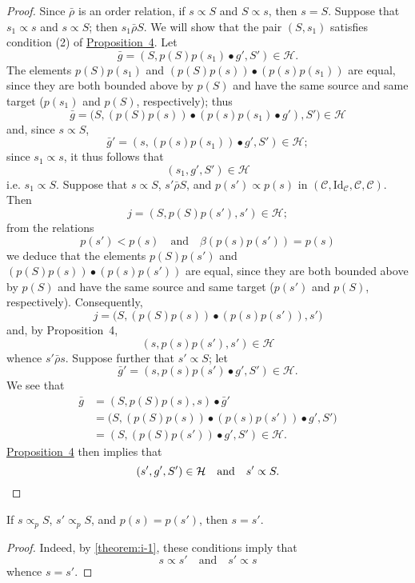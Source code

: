 \documentclass[a4paper,fleqn]{article}
\theoremstyle{plain}
\newenvironment{corollary}[1]
  {\renewcommand\theinnercorollary{#1}\innercorollary}
  {\endinnercorollary}
\theoremstyle{definition}
\newcommand{\oldpage}[1]{{\marginpar{\footnotesize$\bigg\vert$\,\,\,\,\textit{p.~#1}}}}
\newcommand{\textand}{\quad\text{and}\quad}
\newcommand{\CC}{\mathcal{C}}
\newcommand{\HH}{\mathcal{H}}
\newcommand{\relrhobar}{\mathrel{\bar{\rho}}}
\newcommand{\subs}{\mathrel{\propto}}
\newcommand{\Id}{\mathrm{Id}}
\begin{document}
\begin{proof}
  Since $\relrhobar$ is an order relation, if $s\subs S$ and $S\subs s$, then $s=S$.
  Suppose that $s_1\subs s$ and $s\subs S$;
  then $s_1\relrhobar S$.
  We will show that the pair $(S,s_1)$ satisfies condition (2\textquotesingle) of \hyperref[proposition:i-4]{Proposition~4}.
  Let
  \[
    \bar{g}
    = (S,p(S)p(s_1)\bullet g',S')
    \in\HH.
  \]
  The elements $p(S)p(s_1)$ and $(p(S)p(s))\bullet(p(s)p(s_1))$ are equal, since they are both bounded above by $p(S)$ and have the same source and same target ($p(s_1)$ and $p(S)$, respectively);
  thus
  \[
    \bar{g}
    = \big(S,(p(S)p(s))\bullet(p(s)p(s_1)\bullet g'),S'\big)
    \in\HH
  \]
  and, since $s\subs S$,
  \[
    \bar{g}'
    = (s,(p(s)p(s_1))\bullet g', S')
    \in\HH;
  \]
  since $s_1\subs s$, it thus follows that
  \[
    (s_1,g',S')
    \in\HH
  \]
  i.e. $s_1\subs S$.
  Suppose that $s\subs S$, $s'\relrhobar S$, and $p(s')\subs p(s)$ in $(\CC,\Id_\CC,\CC,\CC)$.
  Then
  \[
    j
    = (S,p(S)p(s'),s')
    \in\HH;
  \]
  from the relations
  \[
    p(s') < p(s)
    \textand
    \beta(p(s)p(s')) = p(s)
  \]
  we deduce that the elements $p(S)p(s')$ and $(p(S)p(s))\bullet(p(s)p(s'))$ are equal, since they are both bounded above by $p(S)$ and have the same source and same target ($p(s')$ and $p(S)$, respectively).
  Consequently,
  \[
    j
    = \big(S,(p(S)p(s))\bullet(p(s)p(s')),s'\big)
  \]
  and, by Proposition~4,
  \[
    (s,p(s)p(s'),s')
    \in\HH
  \]
  whence $s'\relrhobar s$.
  Suppose further that $s'\subs S$;
  let
  \[
    \bar{g}'
    = (s,p(s)p(s')\bullet g',S')
    \in\HH.
  \]
  We see that
  \[
    \begin{aligned}
      \bar{g}
      &= (S,p(S)p(s),s)\bullet\bar{g}'
    \\&= \big(S,(p(S)p(s))\bullet(p(s)p(s'))\bullet g',S'\big)
    \\&= (S,(p(S)p(s'))\bullet g',S')
    \in\HH.
    \end{aligned}
  \]
  \oldpage{363}
  \hyperref[proposition:i-4]{Proposition~4} then implies that
  \[
    (s',g',S')\in\HH
    \textand
    s'\subs S.
    \qedhere
  \]
\end{proof}

\begin{corollary}{1}
  If $s\subs_p S$, $s'\subs_p S$, and $p(s)=p(s')$, then $s=s'$.
\end{corollary}

\begin{proof}
  Indeed, by \cref{theorem:i-1}, these conditions imply that
  \[
    s\subs s'
    \textand
    s'\subs s
  \]
  whence $s=s'$.
\end{proof}
\end{document}
